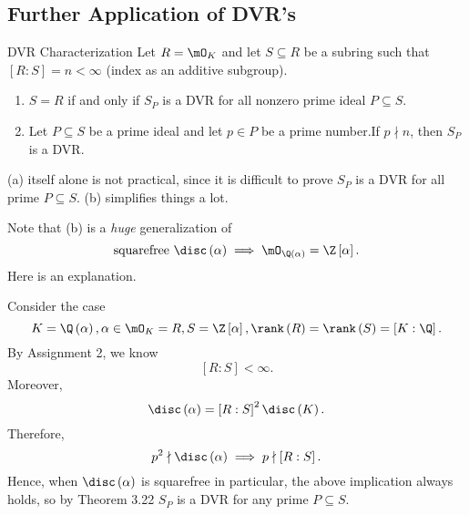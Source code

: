 \documentclass[pmath441]{subfiles}
\begin{document}
    \subsection{Further Application of DVR's}

    \begin{theorem}{DVR Characterization}
        Let $R=\mO_K$ and let $S\subseteq R$ be a subring such that $\left[ R:S \right] = n < \infty$ (index as an additive subgroup).
        \begin{enumerate}
            \item $S=R$ if and only if $S_P$ is a DVR for all nonzero prime ideal $P\subseteq S$.
            \item Let $P\subseteq S$ be a prime ideal and let $p\in P$ be a prime number.\footnotemark[1] If $p\nmid n$, then $S_P$ is a DVR.
        \end{enumerate}
        
        \noindent
        \begin{minipage}{\textwidth}
        \end{minipage}
    \end{theorem}

    \rruleline

    \np (a) itself alone is not practical, since it is difficult to prove $S_P$ is a DVR for all prime $P\subseteq S$. (b) simplifies things a lot.

    \np Note that (b) is a \textit{huge} generalization of
    \begin{equation*}
        \text{squarefree $\disc\left( \alpha \right)$} \implies \mO_{\Q\left( \alpha \right)}=\Z\left[ \alpha \right].
    \end{equation*}
    Here is an explanation.

    Consider the case
    \begin{equation}
        K = \Q\left( \alpha \right), \alpha\in\mO_K=R, S=\Z\left[ \alpha \right], \rank\left( R \right)=\rank\left( S \right)=\left[ K:\Q \right].
    \end{equation}
    By Assignment 2, we know
    \begin{equation*}
        \left[ R:S \right] < \infty.
    \end{equation*}
    Moreover,
    \begin{equation*}
        \disc\left( \alpha \right) = \left[ R:S \right]^{2}\disc\left( K \right).
    \end{equation*}
    Therefore, 
    \begin{equation*}
        p^{2}\nmid\disc\left( \alpha \right) \implies p\nmid\left[ R:S \right].
    \end{equation*}
    Hence, when $\disc\left( \alpha \right)$ is squarefree in particular, the above implication always holds, so by Theorem 3.22 $S_P$ is a DVR for any prime $P\subseteq S$.
    
\end{document}
